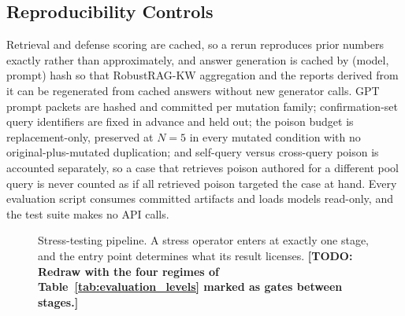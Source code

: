 \documentclass[conference]{IEEEtran}
\newcommand{\TODO}[1]{\textbf{[TODO: #1]}}
\newcommand{\Npoison}{5}         %
\begin{document}
\subsection{Reproducibility Controls}
\label{subsec:repro}
Retrieval and defense scoring are cached, so a rerun reproduces prior numbers
exactly rather than approximately, and answer generation is cached by
(model, prompt) hash so that RobustRAG-KW aggregation and the reports derived
from it can be regenerated from cached answers without new generator calls.
GPT prompt packets are hashed and committed per mutation family; confirmation-set
query identifiers are fixed in advance and held out; the poison budget is
replacement-only, preserved at $N=\Npoison$ in every mutated condition with no
original-plus-mutated duplication; and self-query versus cross-query poison is
accounted separately, so a case that retrieves poison authored for a different
pool query is never counted as if all retrieved poison targeted the case at hand.
Every evaluation script consumes committed artifacts and loads models read-only,
and the test suite makes no API calls.

\begin{figure}[!t]
\centering
\caption{Stress-testing pipeline. A stress operator enters at exactly one stage,
and the entry point determines what its result licenses.
\TODO{Redraw with the four regimes of Table~\ref{tab:evaluation_levels} marked as
gates between stages.}}
\label{fig:pipeline}
\end{figure}
\end{document}
